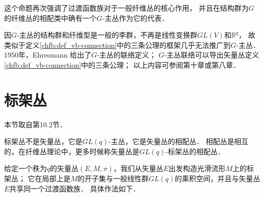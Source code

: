 这个命题再次强调了过渡函数族对于一般纤维丛的核心作用，
并且在结构群为$G$的纤维丛的相配类中确有一个$G$-主丛作为它的代表．


因$G$-主丛的结构群和纤维型是一般的李群，不再是线性变换群$GL(V)$和$\mathbb{R}^q$，
故类似于定义\ref{chfb:def_vb-connection}中的三条公理的框架几乎无法推广到$G$-主丛．
1950年，Ehresmann 给出了$G$-主丛的联络定义；
$G$-主丛联络可以导出矢量丛定义\ref{chfb:def_vb-connection}中的三条公理；
以上内容可参阅\parencite{chen-li-2026-2ed-v2}第十章或\parencite{spivak-dif-2}第八章．






\section{标架丛}\label{chfb:sec_frame-bundles}

本节取自\parencite{chen-li-2026-2ed-v2}第10.2节．

标架丛不是矢量丛，它是$GL(q)$-主丛，它是矢量丛的相配丛．
相配丛是相互的，在纤维丛理论中，更多时候称矢量丛是$GL(q)$-标架丛的相配丛．



给定一个秩为$q$的矢量丛$(E,M,\pi)$，我们从矢量丛$E$出发构造光滑流形$M$上的标架丛；
它在局部上是$M$的开子集与一般线性群$GL(q)$的乘积空间，并且与矢量丛$E$共享同一个过渡函数族．
具体作法如下．

